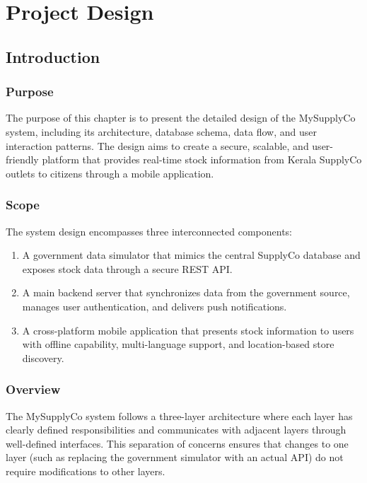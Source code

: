 \chapter{Project Design}

\section{Introduction}

\subsection{Purpose}

The purpose of this chapter is to present the detailed design of the MySupplyCo system, including its architecture, database schema, data flow, and user interaction patterns. The design aims to create a secure, scalable, and user-friendly platform that provides real-time stock information from Kerala SupplyCo outlets to citizens through a mobile application.

\subsection{Scope}

The system design encompasses three interconnected components:
\begin{enumerate}
    \item A government data simulator that mimics the central SupplyCo database and exposes stock data through a secure REST API.
    \item A main backend server that synchronizes data from the government source, manages user authentication, and delivers push notifications.
    \item A cross-platform mobile application that presents stock information to users with offline capability, multi-language support, and location-based store discovery.
\end{enumerate}

\subsection{Overview}

The MySupplyCo system follows a three-layer architecture where each layer has clearly defined responsibilities and communicates with adjacent layers through well-defined interfaces. This separation of concerns ensures that changes to one layer (such as replacing the government simulator with an actual API) do not require modifications to other layers.

